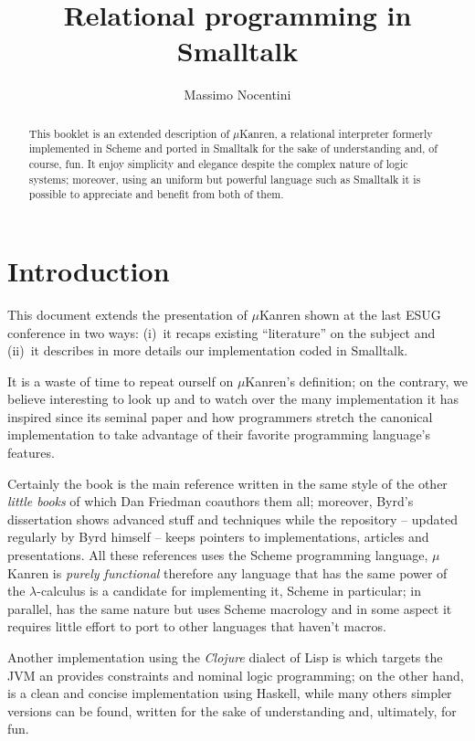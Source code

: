 \documentclass[a4paper,12pt]{article}
\author{Massimo Nocentini}
\title{Relational programming in Smalltalk}
\begin{document}
\maketitle

\begin{abstract}
This booklet is an extended description of $\mu$Kanren, a relational
interpreter formerly implemented in Scheme and ported in Smalltalk for the sake
of understanding and, of course, fun. It enjoy simplicity and elegance despite
the complex nature of logic systems; moreover, using an uniform but powerful
language such as Smalltalk it is possible to appreciate and benefit from both
of them.
\end{abstract}

\section{Introduction}

This document extends the presentation of $\mu$Kanren shown at the last ESUG
conference \citep{ESUG2018} in two ways: (i)~it recaps existing ``literature''
on the subject and (ii)~it describes in more details our implementation coded
in Smalltalk.

It is a waste of time to repeat ourself on $\mu$Kanren's definition; on the
contrary, we believe interesting to look up and to watch over the many
implementation it has inspired since its seminal paper \citep{Hemann:muKanren}
and how programmers stretch the canonical implementation to take advantage of
their favorite programming language's features.

Certainly the book \citep{Friedman:Reasoned:Schemer} is the main reference
written in the same style of the other \emph{little books} of which Dan
Friedman coauthors them all; moreover, Byrd's dissertation \citep{Byrd:PhD}
shows advanced stuff and techniques while the repository
\citep{byrd:minikanren:repo} -- updated regularly by Byrd himself -- keeps
pointers to implementations, articles and presentations. All these references
uses the Scheme programming language, $\mu$Kanren is \emph{purely functional}
therefore any language that has the same power of the $\lambda$-calculus is a
candidate for implementing it, Scheme in particular; in parallel,
\citep{byrd:minikanren} has the same nature but uses Scheme macrology and in
some aspect it requires little effort to port to other languages that haven't
macros.

Another implementation using the \emph{Clojure} dialect of Lisp is
\citep{clojure:core.logic} which targets the JVM an provides constraints and
nominal logic programming; on the other hand, \citep{sullivan:microkanrenhs}
is a clean and concise implementation using Haskell, while many others simpler
versions can be found, written for the sake of understanding and, ultimately,
for fun.
\end{document}

